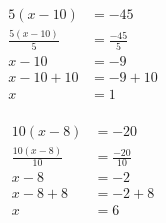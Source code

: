 \documentclass[12pt]{article}
\newcounter{minipagecount}
\begin{document}
\begin{multicols}{2}
\begin{minipage}[t]{0.45\textwidth}
\begin{align*}
        5(x - 10) &= -45\\
        \frac{5(x-10)}{5} &= \frac{-45}{5}\\
        x - 10 &= -9\\
        x - 10 + 10 &= -9 + 10\\
        x &= 1\\
    \end{align*}
\end{minipage} %
\noindent{(\theminipagecount)}\hspace{0.1mm} %
\begin{minipage}[t]{0.45\textwidth} %
    \vspace{-26pt}  %
    \raggedright %
    \begin{align*} %
        10(x - 8) &= -20\\
        \frac{10(x-8)}{10} &= \frac{-20}{10}\\
        x - 8 &= -2\\
        x - 8 + 8 &= -2 + 8\\
        x &= 6\\
    \end{align*}
\end{minipage} %
\noindent{(\theminipagecount)}\hspace{0.1mm} %
\begin{minipage}[t]{0.45\textwidth} %
    \vspace{-26pt}  %
    \raggedright %

\end{minipage}
\end{multicols}
\end{document}
